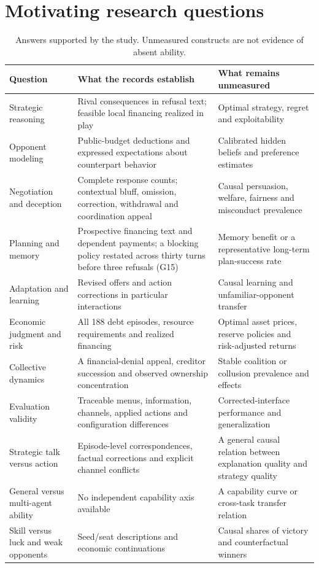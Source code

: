 \section{Motivating research questions}
\label{app:questions}
\begin{longtable}{@{}L{.24\linewidth}L{.39\linewidth}L{.31\linewidth}@{}}
\caption{Answers supported by the study. Unmeasured constructs are not evidence of absent ability.}\\
\toprule Question & What the records establish & What remains unmeasured\\\midrule\endhead
Strategic reasoning & Rival consequences in refusal text; feasible local financing realized in play & Optimal strategy, regret and exploitability\\
Opponent modeling & Public-budget deductions and expressed expectations about counterpart behavior & Calibrated hidden beliefs and preference estimates\\
Negotiation and deception & Complete response counts; contextual bluff, omission, correction, withdrawal and coordination appeal & Causal persuasion, welfare, fairness and misconduct prevalence\\
Planning and memory & Prospective financing text and dependent payments; a blocking policy restated across thirty turns before three refusals (G15) & Memory benefit or a representative long-term plan-success rate\\
Adaptation and learning & Revised offers and action corrections in particular interactions & Causal learning and unfamiliar-opponent transfer\\
Economic judgment and risk & All 188 debt episodes, resource requirements and realized financing & Optimal asset prices, reserve policies and risk-adjusted returns\\
Collective dynamics & A financial-denial appeal, creditor succession and observed ownership concentration & Stable coalition or collusion prevalence and effects\\
Evaluation validity & Traceable menus, information, channels, applied actions and configuration differences & Corrected-interface performance and generalization\\\midrule
Strategic talk versus action & Episode-level correspondences, factual corrections and explicit channel conflicts & A general causal relation between explanation quality and strategy quality\\
General versus multi-agent ability & No independent capability axis available & A capability curve or cross-task transfer relation\\
Skill versus luck and weak opponents & Seed/seat descriptions and economic continuations & Causal shares of victory and counterfactual winners\\\bottomrule
\end{longtable}

